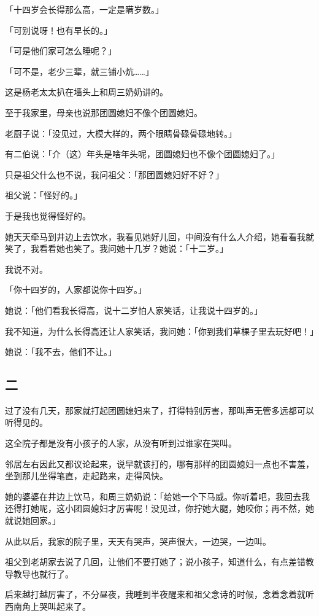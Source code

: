 \documentclass[UTF8]{ctexart}
\begin{document}
「十四岁会长得那么高，一定是瞒岁数。」

「可别说呀！也有早长的。」

「可是他们家可怎么睡呢？」

「可不是，老少三辈，就三铺小炕……」

这是杨老太太扒在墙头上和周三奶奶讲的。

至于我家里，母亲也说那团圆媳妇不像个团圆媳妇。

老厨子说：「没见过，大模大样的，两个眼睛骨碌骨碌地转。」

有二伯说：「介（这）年头是啥年头呢，团圆媳妇也不像个团圆媳妇了。」

只是祖父什么也不说，我问祖父：「那团圆媳妇好不好？」

祖父说：「怪好的。」

于是我也觉得怪好的。

她天天牵马到井边上去饮水，我看见她好儿回，中间没有什么人介绍，她看看我就笑了，我看看她也笑了。我问她十几岁？她说：「十二岁。」

我说不对。

「你十四岁的，人家都说你十四岁。」

她说：「他们看我长得高，说十二岁怕人家笑话，让我说十四岁的。」

我不知道，为什么长得高还让人家笑话，我问她：「你到我们草棵子里去玩好吧！」

她说：{「我不去，他们不让。」}

\subsection{二}

过了没有几天，那家就打起团圆媳妇来了，打得特别厉害，那叫声无管多远都可以听得见的。

这全院子都是没有小孩子的人家，从没有听到过谁家在哭叫。

邻居左右因此又都议论起来，说早就该打的，哪有那样的团圆媳妇一点也不害羞，坐到那儿坐得笔直，走起路来，走得风快。

她的婆婆在井边上饮马，和周三奶奶说：「给她一个下马威。你听着吧，我回去我还得打她呢，这小团圆媳妇才厉害呢！没见过，你拧她大腿，她咬你；再不然，她就说她回家。」

从此以后，我家的院子里，天天有哭声，哭声很大，一边哭，一边叫。

祖父到老胡家去说了几回，让他们不要打她了；说小孩子，知道什么，有点差错教导教导也就行了。

后来越打越厉害了，不分昼夜，我睡到半夜醒来和祖父念诗的时候，念着念着就听西南角上哭叫起来了。
\end{document}

